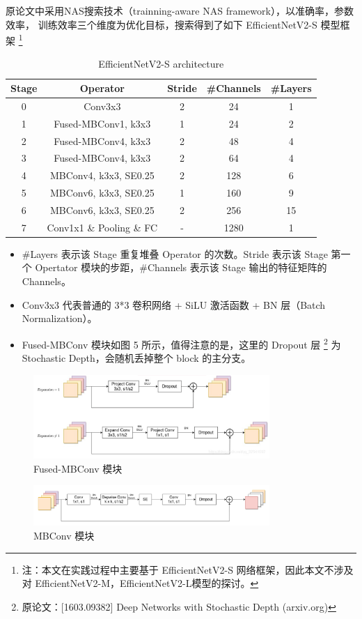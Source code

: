 \documentclass[UTF8,12pt,a4paper]{ctexart}
\begin{document}
原论文中采用NAS搜索技术（trainning-aware NAS framework），以准确率，参数效率，
训练效率三个维度为优化目标，搜索得到了如下 EfficientNetV2-S 模型框架
\footnote{注：本文在实践过程中主要基于 EfficientNetV2-S 网络框架，因此本文不涉及对
EfficientNetV2-M，EfficientNetV2-L模型的探讨。}
\begin{table}[H]
    \centering
    \caption{EfficientNetV2-S architecture}
    \begin{tabular}{ccccc}
    \hline
        Stage & Operator & Stride & \#Channels & \#Layers \\ \hline
        0 & Conv3x3 & 2 & 24 & 1 \\ 
        1 & Fused-MBConv1, k3x3  & 1 & 24 & 2 \\ 
        2 & Fused-MBConv4, k3x3 & 2 & 48 & 4 \\ 
        3 & Fused-MBConv4, k3x3  & 2 & 64 & 4 \\ 
        4 & MBConv4, k3x3, SE0.25 & 2 & 128 & 6 \\ 
        5 & MBConv6, k3x3, SE0.25  & 1 & 160 & 9 \\ 
        6 & MBConv6, k3x3, SE0.25 & 2 & 256 & 15 \\ 
        7 & Conv1x1 \& Pooling \& FC & - & 1280 & 1 \\ \hline
    \end{tabular}
\end{table}
\begin{itemize}
	\item $\#$Layers 表示该 Stage 重复堆叠 Operator 的次数。Stride 表示该 Stage 第一个 
	Opertator 模块的步距，$\#$Channels 表示该 Stage 输出的特征矩阵的 Channels。
	\item Conv3x3 代表普通的 3*3 卷积网络 + SiLU 激活函数 + BN 层（Batch Normalization）。
	\item Fused-MBConv 模块如图 5 所示，值得注意的是，这里的 Dropout 层
	\footnote{原论文：[1603.09382] Deep Networks with Stochastic Depth (arxiv.org)}
	为 Stochastic Depth，会随机丢掉整个 block 的主分支。
\end{itemize}
\begin{figure}[H]
	\centering
	\includegraphics[width=0.8\textwidth]{picture/fused-mbconv.png}
	\caption{Fused-MBConv 模块}
\end{figure}
\begin{figure}[H]
	\centering
	\includegraphics[width=0.8\textwidth]{picture/mbconv.png}
	\caption{MBConv 模块}
\end{figure}
\end{document}
